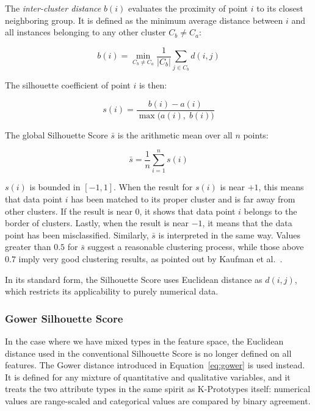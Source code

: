 \vspace {1em}

The \emph{inter-cluster distance} $b(i)$ evaluates the proximity of point $i$ to its closest neighboring group. It is defined as the minimum average distance between $i$ and all instances belonging to any other cluster $C_b \neq C_a$:

\begin{equation}
    b(i) = \min_{C_b \neq C_a} \frac{1}{|C_b|} \sum_{j \in C_b} d(i, j)
    \label{eq:silhouette_b}
\end{equation}

The silhouette coefficient of point $i$ is then:

\begin{equation}
    s(i) = \frac{b(i) - a(i)}{\max\bigl(a(i),\; b(i)\bigr)}
    \label{eq:silhouette_si}
\end{equation}

The global Silhouette Score $\bar{s}$ is the arithmetic mean over all $n$ points:

\begin{equation}
    \bar{s} = \frac{1}{n} \sum_{i=1}^{n} s(i)
    \label{eq:silhouette_global}
\end{equation}

$s(i)$ is bounded in $[-1, 1]$. When the result for $s(i)$ is near $+1$, this means that data point $i$ has been matched to its proper cluster and is far away from other clusters. If the result is near $0$, it shows that data point $i$ belongs to the border of clusters. Lastly, when the result is near $-1$, it means that the data point has been misclassified. Similarly, $\bar{s}$ is interpreted in the same way. Values greater than $0.5$ for $\bar{s}$ suggest a reasonable clustering process, while those above $0.7$ imply very good clustering results, as pointed out by Kaufman et al.~\cite{kaufman1990}.

In its standard form, the Silhouette Score uses Euclidean distance as $d(i,j)$, which restricts its applicability to purely numerical data.

\subsubsection*{Gower Silhouette Score}
\label{ch:gower}

In the case where we have mixed types in the feature space, the Euclidean distance used in the conventional Silhouette Score is no longer defined on all features. The Gower distance introduced in Equation~\eqref{eq:gower} is used instead. It is defined for any mixture of quantitative and qualitative variables, and it treats the two attribute types in the same spirit as K-Prototypes itself: numerical values are range-scaled and categorical values are compared by binary agreement.

